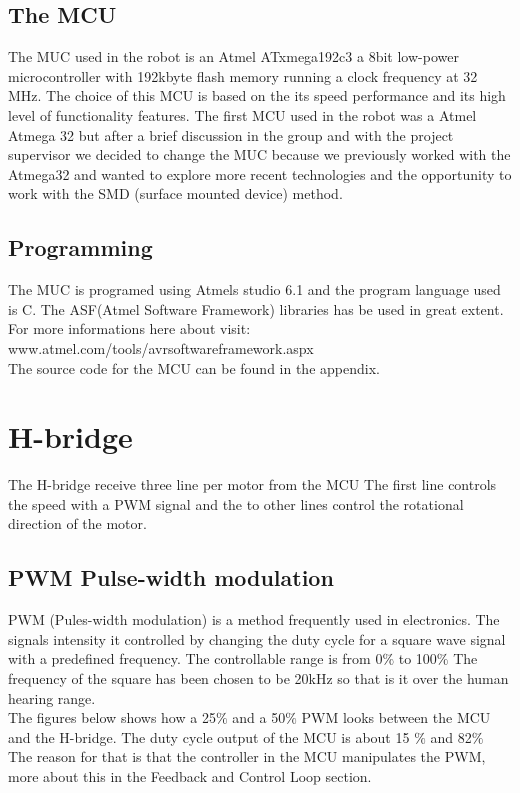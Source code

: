 \subsection{The MCU}
The MUC used in the robot is an Atmel ATxmega192c3 a 8bit low-power microcontroller with 192kbyte flash memory running a clock frequency at 32 MHz. The choice of this MCU is based on the its speed performance and its high level of functionality features. The first MCU used in the robot was a Atmel Atmega 32 but after a brief discussion in the group and with the project supervisor we decided to change the MUC because we previously worked with the Atmega32 and wanted to explore more recent technologies and the opportunity to work with the SMD (surface mounted device) method. 

\subsection{Programming}
The MUC is programed using Atmels studio 6.1 and the program language used is C. The ASF(Atmel Software Framework) libraries has be used in great extent. For more informations here about visit:\\  www.atmel.com/tools/avrsoftwareframework.aspx \\
The source code for the MCU can be found in the appendix. 

\section{H-bridge}

The H-bridge receive three line per motor from the MCU The first line controls the speed with a PWM signal and the to other lines control the rotational direction of the motor.


\newpage

\subsection{PWM Pulse-width modulation}

PWM (Pules-width modulation) is a method frequently used in electronics. The signals intensity it controlled by changing the duty cycle for a square wave signal with a predefined frequency. The controllable range is from 0$\% $ to 100$\%$ 
The frequency of the square has been chosen to be 20kHz so that is it over the human hearing range. 
\\
The figures below shows how a 25$\%$ and a 50$\%$  PWM looks between the MCU and the H-bridge. The duty cycle output of the MCU is about 15 $\%$ and 82$\%$ The reason for that is that the controller in the MCU manipulates the PWM, more about this in the Feedback and Control Loop section.

